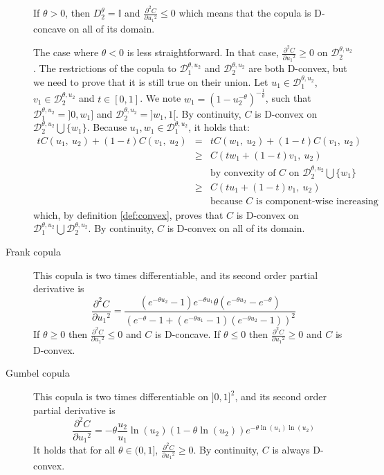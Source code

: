 \begin{remark}
\begin{description}
    If $\theta>0$, then $D^\theta_2=\mathbb{I}$ and $\frac{\partial^2 C}{\partial {u_1}^2}\leqslant0$ which means that the copula is D-concave on all of its domain.
    
    The case where $\theta<0$ is less straightforward. In that case, $\frac{\partial^2 C}{\partial {u_1}^2}\geqslant0$ on $\mathcal{D}_2^{\theta,u_2}$. The restrictions of the copula to $\mathcal{D}_1^{\theta,u_2}$ and $\mathcal{D}_2^{\theta,u_2}$ are both D-convex, but we need to prove that it is still true on their union. Let $u_1\in\mathcal{D}_1^{\theta,u_2}$, $v_1\in\mathcal{D}_2^{\theta,u_2}$ and $t\in[0,1]$. We note $w_1=(1-u_2^{-\theta})^{-\frac{1}{\theta}}$, such that $\mathcal{D}_1^{\theta,u_2}=]0,w_1]$ and $\mathcal{D}_2^{\theta,u_2}=]w_1, 1[$. By continuity, $C$ is D-convex on $\mathcal{D}_2^{\theta,u_2}\bigcup\{w_1\}$. Because $u_1,w_1\in \mathcal{D}_1^{\theta,u_2}$, it holds that:
        \begin{eqnarray*}
            tC(u_1,~u_2)+(1-t)C(v_1,~u_2) &=& tC(w_1,~u_2)+(1-t)C(v_1,~u_2)\\
            &\geqslant& C(tw_1+(1-t)v_1,~u_2)\\
            &&\text{by convexity of $C$ on $\mathcal{D}_2^{\theta,u_2}\bigcup\{w_1\}$}\\
            &\geqslant& C(tu_1+(1-t)v_1,~u_2)\\
            && \text{because $C$ is component-wise increasing}
        \end{eqnarray*}
    which, by definition \ref{def:convex}, proves that $C$ is D-convex on $\mathcal{D}_1^{\theta,u_2}\bigcup \mathcal{D}_2^{\theta,u_2}$. By continuity, $C$ is D-convex on all of its domain.
    \item[Frank copula] This copula is two times differentiable, and its second order partial derivative is
    $$\frac{\partial^2 C}{\partial {u_1}^2}=\frac{(e^{-\theta u_2}-1)e^{-\theta u_1}\theta(e^{-\theta u_2}-e^{-\theta} )}{(e^{-\theta}-1+(e^{-\theta u_1}-1)(e^{-\theta u_2}-1))^2}$$
    If $\theta\geqslant0$ then $\frac{\partial^2 C}{\partial {u_1}^2}\leqslant 0$ and $C$ is D-concave. If $\theta\leqslant0$ then $\frac{\partial^2 C}{\partial {u_1}^2}\geqslant 0$ and $C$ is D-convex.
    \item[Gumbel copula] This copula is two times differentiable on $]0,1]^2$, and its second order partial derivative is
    $$\frac{\partial^2 C}{\partial {u_1}^2}=-\theta\frac{u_2}{u_1}\ln(u_2)(1-\theta\ln(u_2))e^{-\theta\ln(u_1)\ln(u_2)}$$
    It holds that for all $\theta\in(0,1]$, $\frac{\partial^2 C}{\partial {u_1}^2}\geqslant0$. By continuity, $C$ is always D-convex.
    \end{description}
    

\end{remark}
